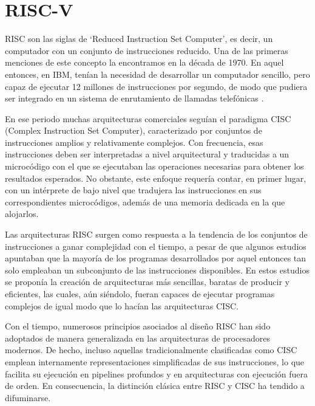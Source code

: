 \chapter{RISC-V}

RISC son las siglas de `Reduced Instruction Set Computer', es decir, un computador con un conjunto de instrucciones reducido. Una de las primeras menciones de este concepto la encontramos en la década de 1970. En aquel entonces, en IBM, tenían la necesidad de desarrollar un computador sencillo, pero capaz de ejecutar 12 millones de instrucciones por segundo, de modo que pudiera ser integrado en un sistema de enrutamiento de llamadas telefónicas \cite{cocke1990evolution}.

En ese periodo muchas arquitecturas comerciales seguían el paradigma CISC (Complex Instruction Set Computer), caracterizado por conjuntos de instrucciones amplios y relativamente complejos. Con frecuencia, esas instrucciones deben ser interpretadas a nivel arquitectural y traducidas a un microcódigo con el que se ejecutaban las operaciones necesarias para obtener los resultados esperados. No obstante, este enfoque requería  contar, en primer lugar, con un intérprete de bajo nivel que tradujera las instrucciones en sus correspondientes microcódigos, además de una memoria dedicada en la que alojarlos.

Las arquitecturas RISC surgen como respuesta a la tendencia de los conjuntos de instrucciones a ganar complejidad con el tiempo, a pesar de que algunos estudios \cite{tanenbaum1978implications} apuntaban que la mayoría de los programas desarrollados por aquel entonces tan solo empleaban un subconjunto de las instrucciones disponibles. En estos estudios se proponía la creación de arquitecturas más sencillas, baratas de producir y eficientes, las cuales, aún siéndolo, fueran capaces de ejecutar programas complejos de igual modo que lo hacían las arquitecturas CISC.

Con el tiempo, numerosos principios asociados al diseño RISC han sido adoptados de manera generalizada en las arquitecturas de procesadores modernos. De hecho, incluso aquellas tradicionalmente clasificadas como CISC emplean internamente representaciones simplificadas de sus instrucciones, lo que facilita su ejecución en pipelines profundos y en arquitecturas con ejecución fuera de orden. En consecuencia, la distinción clásica entre RISC y CISC ha tendido a difuminarse.

